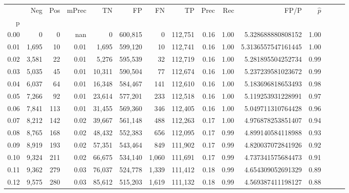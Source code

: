 \begin{tabular}{rrrrrrrrrrrrrrr}
\toprule
{} &     Neg &    Pos & mPrec &       TN &       FP &       FN &       TP &  Prec &   Rec &                    FP/P & $\hat{p}$ \\
p    &         &        &       &          &          &          &          &       &       &                         &           \\
\midrule
0.00 &       0 &      0 &   nan &        0 &  600,815 &        0 &  112,751 &  0.16 &  1.00 &       5.328688880808152 &      1.00 \\
0.01 &   1,695 &     10 &  0.01 &    1,695 &  599,120 &       10 &  112,741 &  0.16 &  1.00 &      5.3136557547161445 &      1.00 \\
0.02 &   3,581 &     22 &  0.01 &    5,276 &  595,539 &       32 &  112,719 &  0.16 &  1.00 &       5.281895504252734 &      0.99 \\
0.03 &   5,035 &     45 &  0.01 &   10,311 &  590,504 &       77 &  112,674 &  0.16 &  1.00 &       5.237239581023672 &      0.99 \\
0.04 &   6,037 &     64 &  0.01 &   16,348 &  584,467 &      141 &  112,610 &  0.16 &  1.00 &       5.183696818653493 &      0.98 \\
0.05 &   7,266 &     92 &  0.01 &   23,614 &  577,201 &      233 &  112,518 &  0.16 &  1.00 &       5.119253931228991 &      0.97 \\
0.06 &   7,841 &    113 &  0.01 &   31,455 &  569,360 &      346 &  112,405 &  0.16 &  1.00 &       5.049711310764428 &      0.96 \\
0.07 &   8,212 &    142 &  0.02 &   39,667 &  561,148 &      488 &  112,263 &  0.17 &  1.00 &       4.976878253851407 &      0.94 \\
0.08 &   8,765 &    168 &  0.02 &   48,432 &  552,383 &      656 &  112,095 &  0.17 &  0.99 &       4.899140584118988 &      0.93 \\
0.09 &   8,919 &    193 &  0.02 &   57,351 &  543,464 &      849 &  111,902 &  0.17 &  0.99 &       4.820037072841926 &      0.92 \\
0.10 &   9,324 &    211 &  0.02 &   66,675 &  534,140 &    1,060 &  111,691 &  0.17 &  0.99 &       4.737341575684473 &      0.91 \\
0.11 &   9,362 &    279 &  0.03 &   76,037 &  524,778 &    1,339 &  111,412 &  0.18 &  0.99 &       4.654309052691329 &      0.89 \\
0.12 &   9,575 &    280 &  0.03 &   85,612 &  515,203 &    1,619 &  111,132 &  0.18 &  0.99 &       4.569387411198127 &      0.88 \\

\end{tabular}
